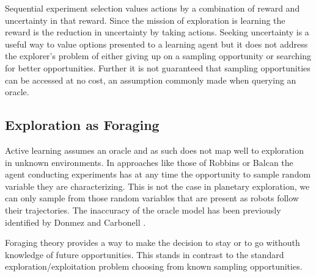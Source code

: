 Sequential experiment selection values actions by a combination of reward and
uncertainty in that reward.  Since the mission of exploration is learning the
reward is the reduction in uncertainty by taking actions.  Seeking uncertainty
is a useful way to value options presented to a learning agent but it does not
address the explorer's problem of either giving up on a sampling opportunity
or searching for better opportunities.  Further it is not guaranteed that
sampling opportunities can be accessed at no cost, an assumption commonly made
when querying an oracle.


\subsection{Exploration as Foraging}



Active learning assumes an oracle and as such does not map well to exploration
in unknown environments.  In approaches like those of Robbins
\cite{robbins1952some} or Balcan \cite{balcan2006agnostic} the agent conducting
experiments has at any time the opportunity to sample random variable they
are characterizing.  This is not the case in planetary exploration, we can only
sample from those random variables that are present as robots follow their
trajectories.  The inaccuracy of the oracle model has been previously identified by Donmez and Carbonell \cite{donmez2008proactive}.

Foraging theory provides a way to make the decision to stay or to go
 withouth knowledge of future opportunities.  This stands in contrast to the
standard exploration/exploitation problem choosing from known sampling
opportunities.



